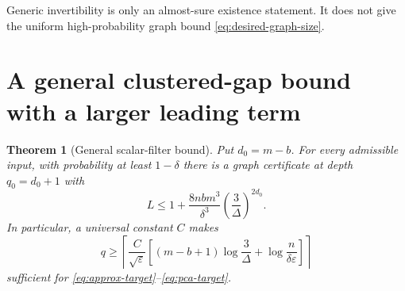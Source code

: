 \documentclass[11pt]{article}
\newtheorem{theorem}{Theorem}[section]
\theoremstyle{definition}
\begin{document}
Generic invertibility is only an almost-sure existence statement. It does
not give the uniform high-probability graph bound
\eqref{eq:desired-graph-size}.

\section{A general clustered-gap bound with a larger leading term}
\label{sec:general}

\begin{theorem}[General scalar-filter bound]
\label{thm:general}
Put $d_0=m-b$. For every admissible input, with probability at least
$1-\delta$ there is a graph certificate at depth $q_0=d_0+1$ with
\begin{equation}
 L\leq1+\frac{8nbm^3}{\delta^3}
                   \left(\frac3\Delta\right)^{2d_0}.
 \label{eq:general-L}
\end{equation}
In particular, a universal constant $C$ makes
\begin{equation}
 q\geq\left\lceil\frac C{\sqrt\varepsilon}
 \left[(m-b+1)\log\frac3\Delta+
             \log\frac n{\delta\varepsilon}\right]\right\rceil
 \label{eq:general-q}
\end{equation}
sufficient for \eqref{eq:approx-target}--\eqref{eq:pca-target}.
\end{theorem}
\end{document}

